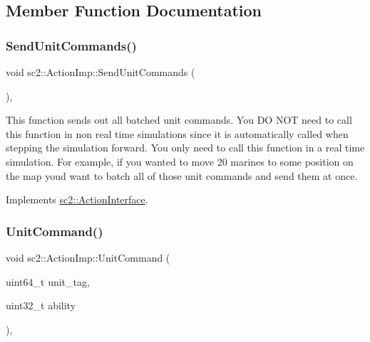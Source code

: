 \subsection{Member Function Documentation}
\mbox{\label{classsc2_1_1_action_imp_a1edc0de46368f2c2edb79aa098727fb4}} 
\subsubsection{\texorpdfstring{Send\+Unit\+Commands()}{SendUnitCommands()}}
{\footnotesize\ttfamily void sc2\+::\+Action\+Imp\+::\+Send\+Unit\+Commands (\begin{DoxyParamCaption}{ }\end{DoxyParamCaption})\hspace{0.3cm}{\ttfamily [override]}, {\ttfamily [virtual]}}

This function sends out all batched unit commands. You DO N\+OT need to call this function in non real time simulations since it is automatically called when stepping the simulation forward. You only need to call this function in a real time simulation. For example, if you wanted to move 20 marines to some position on the map you\textquotesingle{}d want to batch all of those unit commands and send them at once. 

Implements \hyperlink{classsc2_1_1_action_interface_afcb1dd0c6fa8b4d19d8bf4ede94d38d4}{sc2\+::\+Action\+Interface}.

\mbox{\label{classsc2_1_1_action_imp_a633373febea0f4d74a2888932fa53733}} 
\subsubsection{\texorpdfstring{Unit\+Command()}{UnitCommand()}\hspace{0.1cm}{\footnotesize\ttfamily [1/6]}}
{\footnotesize\ttfamily void sc2\+::\+Action\+Imp\+::\+Unit\+Command (\begin{DoxyParamCaption}\item[{uint64\+\_\+t}]{unit\+\_\+tag,  }\item[{uint32\+\_\+t}]{ability }\end{DoxyParamCaption})\hspace{0.3cm}{\ttfamily [override]}, {\ttfamily [virtual]}}

